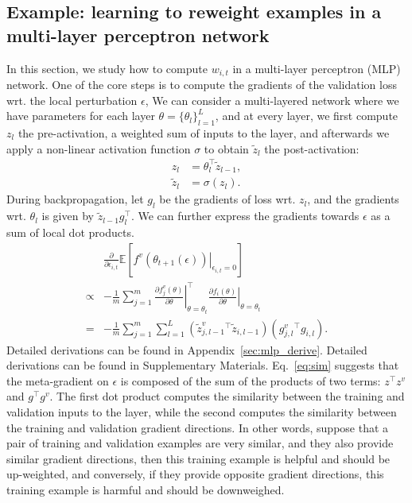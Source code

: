 \subsection{Example: learning to reweight examples in a multi-layer perceptron network}
In this section, we study how to compute $w_{i,t}$ in a multi-layer perceptron (MLP) network. One of
the core steps is to compute the gradients of the validation loss wrt. the local perturbation
$\epsilon$, We can consider a multi-layered network where we have parameters for each layer $\theta
= \{\theta_l\}_{l=1}^L$, and at every layer, we first compute $z_l$ the pre-activation, a weighted
sum of inputs to the layer, and afterwards we apply a non-linear activation function $\sigma$ to
obtain $\tilde{z}_l$ the post-activation:
\begin{align}
z_l &= \theta_l^\top \tilde{z}_{l-1},\\
\tilde{z}_l &= \sigma(z_l).
\end{align}
During backpropagation, let $g_l$ be the gradients of loss wrt. $z_l$, and the gradients wrt.
$\theta_l$ is given by $\tilde{z}_{l-1} g_l^\top$.
We can further express the gradients towards $\epsilon$ as a sum of local dot products.
\begin{align}
&\frac{\partial}{\partial \epsilon_{i,t}} \mathbb{E}\left[ \left.f^v(\theta_{t+1}(\epsilon))
\right\vert_{\epsilon_{i,t}=0} \right]\\
\propto&-\frac{1}{m}\sum_{j=1}^m 
\left. \frac{\partial f_j^v(\theta)}{\partial \theta}\right\vert_{\theta=\theta_t}^\top
\left. \frac{\partial f_i(\theta)}{\partial \theta}\right\vert_{\theta=\theta_t}\\
=&-\frac{1}{m}\sum_{j=1}^m \sum_{l=1}^L
(\tilde{z}^v_{j,l-1}{}^\top
\tilde{z}_{i,l-1})
(g^v_{j,l}{}^\top g_{i,l}).
\label{eq:sim}
\end{align}
\if{}
Detailed derivations can be found in Appendix~\ref{sec:mlp_derive}. 
\else
Detailed derivations can be found in Supplementary Materials.
\fi
Eq.~\ref{eq:sim} suggests that
the meta-gradient on $\epsilon$ is composed of the sum of the products of two terms: $z^\top z^v$
and $g^\top g^v$. The first dot product computes the similarity between the training and validation
inputs to the layer, while the second computes the similarity between the training and validation
gradient directions. In other words, suppose that a pair of training and validation examples are
very similar, and they also provide similar gradient directions, then this training example is
helpful and should be up-weighted, and conversely, if they provide opposite gradient directions,
this training example is harmful and should be downweighed.


